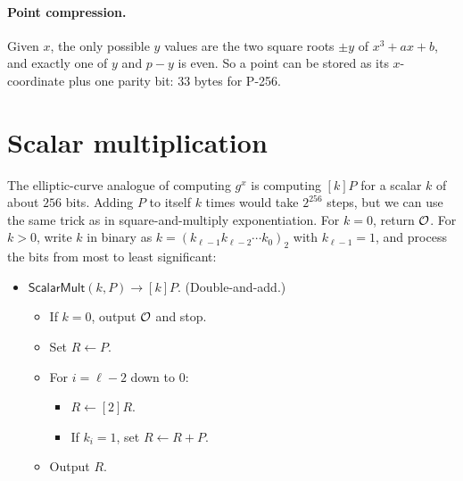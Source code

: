 \paragraph{Point compression.}
\label{sec:compression}
Given $x$, the only possible $y$ values are the two square roots $\pm y$ of
$x^3 + ax + b$, and exactly one of $y$ and $p - y$ is even.
So a point can be stored as its $x$-coordinate plus one parity bit:
$33$ bytes for P-256.

\section{Scalar multiplication}
\label{sec:scalarmult}

The elliptic-curve analogue of computing $g^x$ is computing $[k]P$ for a
scalar $k$ of about $256$ bits.
Adding $P$ to itself $k$ times would take $2^{256}$ steps, but we can use
the same trick as in square-and-multiply exponentiation.
For $k = 0$, return $\mathcal{O}$. For $k > 0$, write $k$ in binary as $k = (k_{\ell-1} k_{\ell-2} \cdots k_0)_2$ with
$k_{\ell-1} = 1$, and process the bits from most to least significant:

\begin{itemize}
  \item $\mathsf{ScalarMult}(k, P) \to [k]P$. (Double-and-add.)
  \begin{itemize}[noitemsep]
    \item If $k = 0$, output $\mathcal{O}$ and stop.
    \item Set $R \gets P$.
    \item For $i = \ell - 2$ down to $0$:
    \begin{itemize}[noitemsep]
      \item $R \gets [2]R$.
      \item If $k_i = 1$, set $R \gets R + P$.
    \end{itemize}
    \item Output $R$.
  \end{itemize}
\end{itemize}

